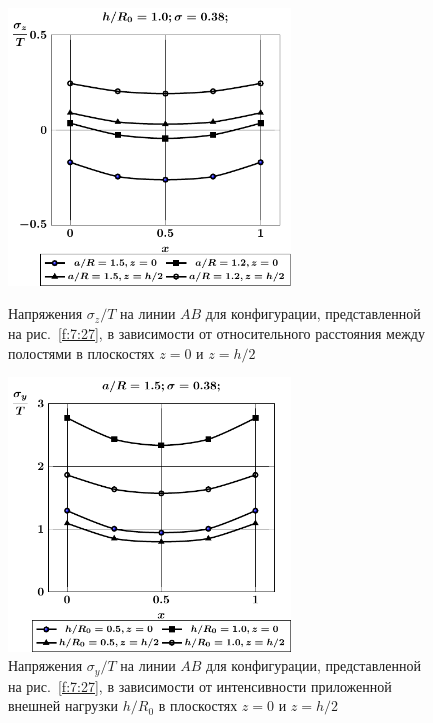 \begin{figure}[h!]
\centering\footnotesize
\parbox[b]{7.5cm}{\centering\includegraphics[width=7.5cm]{cav16-sig_z.pdf}
\caption{Напряжения $\sigma_z/T$ на линии $AB$ для конфигурации, представленной на рис.~\ref{f:7:27}, в зависимости от относительного расстояния между полостями в плоскостях $z=0$ и $z=h/2$
\label{f:7:30}}}\hfil\hfil
\parbox[b]{7.5cm}{\centering\includegraphics[width=7.5cm]{cav16-h-sig_y.pdf}
\caption{Напряжения $\sigma_y/T$ на линии $AB$ для конфигурации, представленной на рис.~\ref{f:7:27}, в зависимости от интенсивности приложенной внешней нагрузки $h/R_0$ в плоскостях $z=0$ и $z=h/2$
\label{f:7:31}}}
\end{figure}

